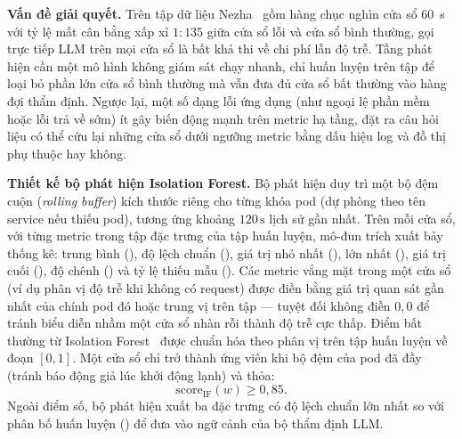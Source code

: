 \textbf{Vấn đề giải quyết.} Trên tập dữ liệu Nezha~\cite{nezha} gồm hàng chục nghìn cửa sổ 60~s với tỷ lệ mất cân bằng xấp xỉ $1:135$ giữa cửa sổ lỗi và cửa sổ bình thường, gọi trực tiếp LLM trên mọi cửa sổ là bất khả thi về chi phí lẫn độ trễ. Tầng phát hiện cần một mô hình không giám sát chạy nhanh, chỉ huấn luyện trên tập  để loại bỏ phần lớn cửa sổ bình thường mà vẫn đưa đủ cửa sổ bất thường vào hàng đợi thẩm định. Ngược lại, một số dạng lỗi ứng dụng (như ngoại lệ phần mềm hoặc lỗi trả về sớm) ít gây biến động mạnh trên metric hạ tầng, đặt ra câu hỏi liệu có thể cứu lại những cửa sổ dưới ngưỡng metric bằng dấu hiệu log và đồ thị phụ thuộc hay không.

\textbf{Thiết kế bộ phát hiện Isolation Forest.} Bộ phát hiện  duy trì một bộ đệm cuộn (\emph{rolling buffer}) kích thước  riêng cho từng khóa pod (dự phòng theo tên service nếu thiếu pod), tương ứng khoảng $120\,\text{s}$ lịch sử gần nhất. Trên mỗi cửa sổ, với từng metric trong tập đặc trưng của tập huấn luyện, mô-đun trích xuất bảy thống kê: trung bình (), độ lệch chuẩn (), giá trị nhỏ nhất (), lớn nhất (), giá trị cuối (), độ chênh () và tỷ lệ thiếu mẫu (). Các metric vắng mặt trong một cửa sổ (ví dụ phân vị độ trễ  khi không có request) được điền bằng giá trị quan sát gần nhất của chính pod đó hoặc trung vị trên tập  — tuyệt đối không điền $0{,}0$ để tránh biểu diễn nhầm một cửa sổ nhàn rỗi thành độ trễ cực thấp. Điểm bất thường từ Isolation Forest~\cite{isof} được chuẩn hóa theo phân vị trên tập huấn luyện về đoạn $[0, 1]$. Một cửa sổ chỉ trở thành ứng viên  khi bộ đệm của pod đã đầy (tránh báo động giả lúc khởi động lạnh) và thỏa:
\begin{equation}
  \text{score}_{\text{IF}}(w) \ge 0{,}85.
  \label{eq:ch4-if-rule}
\end{equation}
Ngoài điểm số, bộ phát hiện xuất ba đặc trưng có độ lệch chuẩn lớn nhất so với phân bố huấn luyện () để đưa vào ngữ cảnh của bộ thẩm định LLM.

